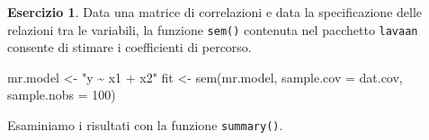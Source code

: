 \documentclass[
  11pt,
]{krantz}
\makeatletter
\newenvironment{Shaded}{\begin{snugshade}}{\end{snugshade}}
\newcommand{\AttributeTok}[1]{\textcolor[rgb]{0.61,0.61,0.61}{#1}}
\newcommand{\DecValTok}[1]{\textcolor[rgb]{0.06,0.06,0.06}{#1}}
\newcommand{\FunctionTok}[1]{\textcolor[rgb]{0,0,0}{#1}}
\newcommand{\NormalTok}[1]{#1}
\newcommand{\OtherTok}[1]{\textcolor[rgb]{0.37,0.37,0.37}{#1}}
\newcommand{\StringTok}[1]{\textcolor[rgb]{0.5,0.5,0.5}{#1}}
\newenvironment{kframe}{%
\medskip{}
\setlength{\fboxsep}{.8em}
 \def\at@end@of@kframe{}%
 \ifinner\ifhmode%
  \def\at@end@of@kframe{\end{minipage}}%
  \begin{minipage}{\columnwidth}%
 \fi\fi%
 \def\FrameCommand##1{\hskip\@totalleftmargin \hskip-\fboxsep
 \colorbox{shadecolor}{##1}\hskip-\fboxsep
     \hskip-\linewidth \hskip-\@totalleftmargin \hskip\columnwidth}%
 \MakeFramed {\advance\hsize-\width
   \@totalleftmargin\z@ \linewidth\hsize
   \@setminipage}}%
 {\par\unskip\endMakeFramed%
 \at@end@of@kframe}
\renewenvironment{Shaded}{\begin{kframe}}{\end{kframe}}
\theoremstyle{definition}
\theoremstyle{definition}
\theoremstyle{definition}
\newtheorem{exercise}{Esercizio}[chapter]
\theoremstyle{definition}
\theoremstyle{remark}
\makeatother
\begin{document}
\begin{exercise}
Data una matrice di correlazioni e data la specificazione delle relazioni tra le variabili, la funzione \texttt{sem()} contenuta nel pacchetto \texttt{lavaan} consente di stimare i coefficienti di percorso.

\begin{Shaded}
\begin{Highlighting}[]
\NormalTok{mr.model }\OtherTok{\textless{}{-}} \StringTok{"y \textasciitilde{} x1 + x2"}
\NormalTok{fit }\OtherTok{\textless{}{-}} \FunctionTok{sem}\NormalTok{(mr.model, }\AttributeTok{sample.cov =}\NormalTok{ dat.cov, }\AttributeTok{sample.nobs =} \DecValTok{100}\NormalTok{)}
\end{Highlighting}
\end{Shaded}

Esaminiamo i risultati con la funzione \texttt{summary()}.


\end{exercise}
\end{document}
